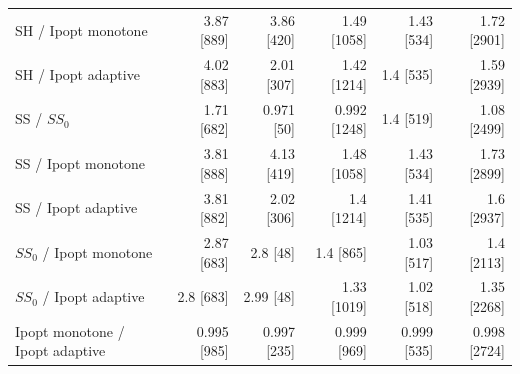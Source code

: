 \begin{tabular}{@{}lrrrrr@{}}
SH / Ipopt monotone & 3.87 [889] & 3.86 [420] & 1.49 [1058] & 1.43 [534] & 1.72 [2901]\\
SH / Ipopt adaptive & 4.02 [883] & 2.01 [307] & 1.42 [1214] & 1.4 [535] & 1.59 [2939]\\
SS / $SS_0$ & 1.71 [682] & 0.971 [50] & 0.992 [1248] & 1.4 [519] & 1.08 [2499]\\
SS / Ipopt monotone & 3.81 [888] & 4.13 [419] & 1.48 [1058] & 1.43 [534] & 1.73 [2899]\\
SS / Ipopt adaptive & 3.81 [882] & 2.02 [306] & 1.4 [1214] & 1.41 [535] & 1.6 [2937]\\
$SS_0$ / Ipopt monotone & 2.87 [683] & 2.8 [48] & 1.4 [865] & 1.03 [517] & 1.4 [2113]\\
$SS_0$ / Ipopt adaptive & 2.8 [683] & 2.99 [48] & 1.33 [1019] & 1.02 [518] & 1.35 [2268]\\
Ipopt monotone / Ipopt adaptive & 0.995 [985] & 0.997 [235] & 0.999 [969] & 0.999 [535] & 0.998 [2724]\\
\bottomrule
\end{tabular}
